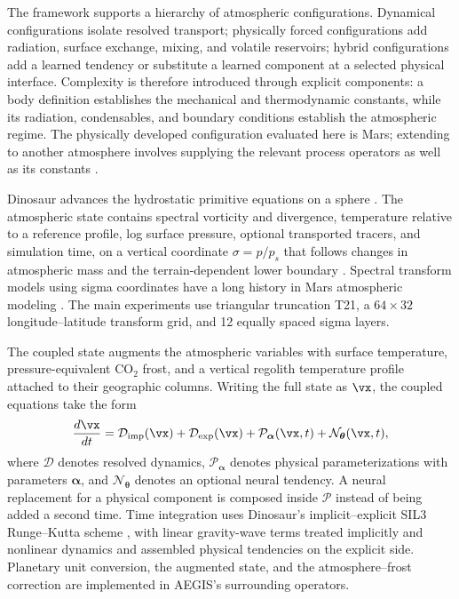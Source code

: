 \documentclass{article} %
\newcommand{\co}{CO$_2$}
\begin{document}
The framework supports a hierarchy of atmospheric configurations. Dynamical configurations isolate resolved transport; physically forced configurations add radiation, surface exchange, mixing, and volatile reservoirs; hybrid configurations add a learned tendency or substitute a learned component at a selected physical interface. Complexity is therefore introduced through explicit components: a body definition establishes the mechanical and thermodynamic constants, while its radiation, condensables, and boundary conditions establish the atmospheric regime. The physically developed configuration evaluated here is Mars; extending to another atmosphere involves supplying the relevant process operators as well as its constants \citep{hu2025stablemachinelearningparameterizationsubgrid}.

Dinosaur advances the hydrostatic primitive equations on a sphere \citep{kochkov2024,davenport2026}. The atmospheric state contains spectral vorticity and divergence, temperature relative to a reference profile, log surface pressure, optional transported tracers, and simulation time, on a vertical coordinate $\sigma=p/p_s$ that follows changes in atmospheric mass and the terrain-dependent lower boundary \citep{Richardson2018OnTR}. 
Spectral transform models using sigma coordinates have a long history in Mars atmospheric modeling \citep{wilson1997stationarywaves}. The main experiments use triangular truncation T21, a $64\times32$ longitude--latitude transform grid, and 12 equally spaced sigma layers.

The coupled state augments the atmospheric variables with surface temperature, pressure-equivalent \co{} frost, and a vertical regolith temperature profile attached to their geographic columns. Writing the full state as $\vx$, the coupled equations take the form
\begin{equation}
 \frac{d\vx}{dt}=\mathcal{D}_{\mathrm{imp}}(\vx)
 +\mathcal{D}_{\mathrm{exp}}(\vx)
 +\mathcal{P}_{\boldsymbol{\alpha}}(\vx,t)
 +\mathcal{N}_{\boldsymbol{\theta}}(\vx,t),
 \label{eq:coupled}
\end{equation}
where $\mathcal{D}$ denotes resolved dynamics, $\mathcal{P}_{\boldsymbol{\alpha}}$ denotes physical parameterizations with parameters $\boldsymbol{\alpha}$, and $\mathcal{N}_{\boldsymbol{\theta}}$ denotes an optional neural tendency. A neural replacement for a physical component is composed inside $\mathcal{P}$ instead of being added a second time. Time integration uses Dinosaur's implicit--explicit SIL3 Runge--Kutta scheme \citep{whitaker2013}, with linear gravity-wave terms treated implicitly and nonlinear dynamics and assembled physical tendencies on the explicit side. Planetary unit conversion, the augmented state, and the atmosphere--frost correction are implemented in AEGIS's surrounding operators.
\end{document}
